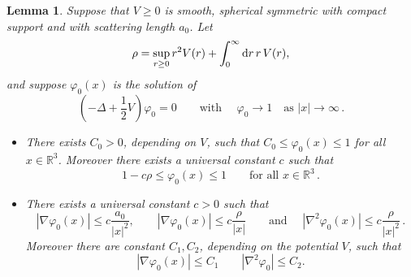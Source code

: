 \documentclass[11pt]{article}
\newtheorem{lemma}[theorem]{Lemma}
\newcommand{\rd}{{\rm d}}
\newcommand{\ph}{\varphi}
\newcommand{\bR}{{\mathbb R}}
\begin{document}
\begin{lemma}\label{lm:ph0}
Suppose that $V \geq 0$ is smooth, spherical symmetric with compact
support and with scattering length $a_0$. Let
\begin{equation}\label{eq:defrho2}
\rho = \sup_{r \geq 0} r^2 V(r)+\int_0^{\infty} \rd r \, r \,
V(r),\end{equation} and suppose $\ph_0 (x)$ is the solution of
\begin{equation}\label{eq:scatte}
\left(-\Delta + \frac{1}{2} V\right) \ph_0 = 0 \qquad \text{with }
\quad \ph_0 \to 1 \quad \text{as } |x| \to \infty \,.\end{equation}
\begin{itemize}
\item[i)] There exists $C_0>0$, depending on $V$, such that $C_0 \leq \ph_0
(x) \leq 1$ for all $x \in \bR^3$. Moreover there exists a universal
constant $c$ such that
\begin{equation}\label{eq:ph0-bou}
1 - c \rho \leq \ph_0 (x) \leq 1 \qquad \text{for all } x \in \bR^3
\, . \end{equation}
\item[ii)] There exists a universal constant $c>0$ such that
\begin{equation}\label{eq:oneder}
|\nabla \ph_0 (x)| \leq c \frac{a_0}{|x|^2}, \qquad |\nabla \ph_0
(x)| \leq c \frac{\rho}{|x|} \qquad \text{and } \quad |\nabla^2
\ph_0 (x)| \leq c \frac{\rho}{|x|^2} \,.
\end{equation}
Moreover there are constant $C_1,C_2$, depending on the potential
$V$, such that
\begin{equation}\label{eq:twoder}
|\nabla \ph_0 (x)| \leq C_1 \qquad |\nabla^2 \ph_0| \leq C_2 .
\end{equation}
\end{itemize}
\end{lemma}
\end{document}
